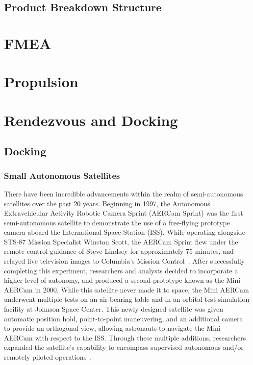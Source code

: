 \documentclass[onecolumn,10pt]{jhwhw}
\begin{document}
\section{Product Breakdown Structure}

\chapter{FMEA}
\chapter{Propulsion}

\chapter{Rendezvous and Docking}

\section{Docking}
\subsection{Small Autonomous Satellites}
There have been incredible advancements within the realm of semi-autonomous satellites over the past 20 years. Beginning in 1997, the Autonomous Extravehicular Activity Robotic Camera Sprint (AERCam Sprint) was the first semi-autonomous satellite to demonstrate the use of a free-flying prototype camera aboard the International Space Station (ISS). While operating alongside STS-87 Mission Specialist Winston Scott, the AERCam Sprint flew under the remote-control guidance of Steve Lindsey for approximately 75 minutes, and relayed live television images to Columbia's Mission Control~\cite{Aercam,MiniAercam}. After successfully completing this experiment, researchers and analysts decided to incorporate a higher level of autonomy, and produced a second prototype known as the Mini AERCam in 2000. While this satellite never made it to space, the Mini AERCam underwent multiple tests on an air-bearing table and in an orbital test simulation facility at Johnson Space Center. This newly designed satellite was given automatic position hold, point-to-point maneuvering, and an additional camera to provide an orthogonal view, allowing astronauts to navigate the Mini AERCam with respect to the ISS. Through these multiple additions, researchers expanded the satellite's capability to encompass supervised autonomous and/or remotely piloted operations~\cite{MiniAercam,MiniAercam2}.
\end{document}

